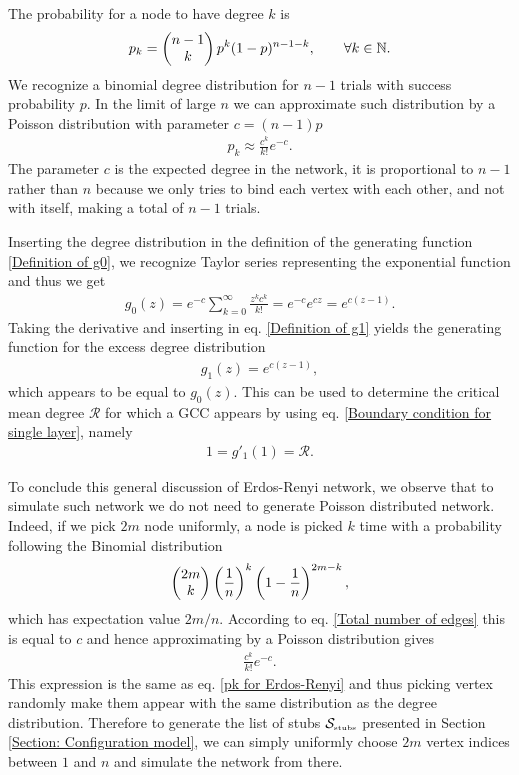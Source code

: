\documentclass[
11pt, %
english, %
singlespacing, %
nolistspacing, %
liststotoc, %
headsepline, %
]{MastersDoctoralThesis} %
\begin{document}
The probability for a node to have degree $k$ is
\begin{align}
	p_k = \begin{pmatrix} n-1 \\ k \end{pmatrix} p^k (1 - p)^{n - 1 - k}, \qquad \forall k \in \mathbb{N}. \label{Poisson degree distribution}
\end{align}
We recognize a binomial degree distribution for $n-1$ trials with success probability $p$. In the limit of large $n$ we can approximate such distribution by a Poisson distribution with parameter $c = (n - 1) p$
\begin{align}
	p_k \approx \frac{c^k}{k!} e^{-c}.  \label{pk for Erdos-Renyi}
\end{align}
The parameter $c$ is the expected degree in the network, it is proportional to $n - 1$ rather than $n$ because we only tries to bind each vertex with each other, and not with itself, making a total of $n-1$ trials.

Inserting the degree distribution in the definition of the generating function \eqref{Definition of g0}, we recognize Taylor series representing the exponential function and thus we get
\begin{align}
	g_0(z) = e^{-c} \sum_{k = 0}^\infty \frac{z^k c^k}{k!} = e^{-c} e^{c z} = e^{c(z - 1)}. \label{g0 for ER networks}
\end{align}
Taking the derivative and inserting in eq. \eqref{Definition of g1} yields the generating function for the excess degree distribution
\begin{align} 
	g_1(z) = e^{c(z - 1)},  \label{g1 for ER networks}
\end{align}
which appears to be equal to $g_0(z)$. This can be used to determine the critical mean degree $\mathcal{R}$ for which a GCC appears by using eq. \eqref{Boundary condition for single layer}, namely
\begin{align}
	1 = g'_1(1) = \mathcal{R}.
\end{align}

To conclude this general discussion of Erdos-Renyi network, we observe that to simulate such network we do not need to generate Poisson distributed network. Indeed, if we pick $2 m$ node uniformly, a node is picked $k$ time with a probability following the Binomial distribution
\begin{align}
	\begin{pmatrix} 2m \\ k \end{pmatrix} \left(\frac{1}{n}\right)^k \left(1 - \frac{1}{n}\right)^{2 m - k},
\end{align}
which has expectation value $2 m/n$. According to eq. \eqref{Total number of edges} this is equal to $c$ and hence approximating by a Poisson distribution gives
\begin{align}
	\frac{c^k}{k!} e^{-c}.
\end{align}
This expression is the same as eq. \eqref{pk for Erdos-Renyi} and thus picking vertex randomly make them appear with the same distribution as the degree distribution. Therefore to generate the list of stubs $\mathcal{S}_{\text{\tiny stubs}}$ presented in Section \ref{Section: Configuration model}, we can simply uniformly choose $2m$ vertex indices between $1$ and $n$ and simulate the network from there.
\end{document}
